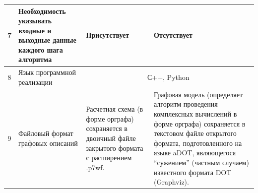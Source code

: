\begin{landscape}
\begin{longtable}{|c|p{}|p{}|p{}|}
    \hline
    7          & Необходимость указывать входные и выходные данные каждого шага алгоритма                   & Присутствует                                                                                                                                                                                                                                                                                                                                                                                                                                                                                                                                                                                                                                                      & Отсутствует                                                                                                                                                                                                                                                                       \\
    \hline
    8          & Язык программной реализации                                                                & \multicolumn{2}{c|}{С++, Python}                                                                                                                                                                                                                                                                                                                                                                                                                                                                                                                                                                                                                                                                                                                                                                                                                                                                                                                      \\
    \hline
    9          & Файловый формат графовых описаний                                                          & Расчетная схема (в форме орграфа) сохраняется в двоичный файле закрытого формата с расширением \textsf{.p7wf}.                                                                                                                                                                                                                                                                                                                                                                                                                                                                                                                                                    & Графовая модель (определяет алгоритм проведения комплексных вычислений в форме орграфа) сохраняется в текстовом файле открытого формата, подготовленного на языке \gls{aDOT}\cite{SokolovADOT2020}, являющегося ``сужением'' (частным случаем) известного формата DOT (Graphviz). \\

\end{longtable}
\end{landscape}
